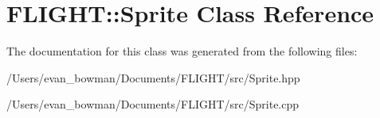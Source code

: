 \hypertarget{class_f_l_i_g_h_t_1_1_sprite}{}\section{F\+L\+I\+G\+HT\+:\+:Sprite Class Reference}
\label{class_f_l_i_g_h_t_1_1_sprite}


The documentation for this class was generated from the following files\+:\begin{DoxyCompactItemize}
\item 
/\+Users/evan\+\_\+bowman/\+Documents/\+F\+L\+I\+G\+H\+T/src/Sprite.\+hpp\item 
/\+Users/evan\+\_\+bowman/\+Documents/\+F\+L\+I\+G\+H\+T/src/Sprite.\+cpp\end{DoxyCompactItemize}

